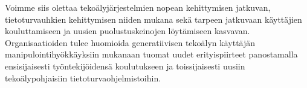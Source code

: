 \begin{otherlanguage}{finnish}
Voimme siis olettaa tekoälyjärjestelmien nopean kehittymisen jatkuvan, tietoturvauhkien kehittymisen niiden mukana sekä tarpeen jatkuvaan käyttäjien kouluttamiseen ja uusien puolustuskeinojen löytämiseen kasvavan. Organisaatioiden tulee huomioida generatiivisen tekoälyn käyttäjän manipulointihyökkäyksiin mukanaan tuomat uudet erityispiirteet panostamalla ensisijaisesti työntekijöidensä koulutukseen ja toissijaisesti uusiin tekoälypohjaisiin tietoturvaohjelmistoihin.





\end{otherlanguage}


